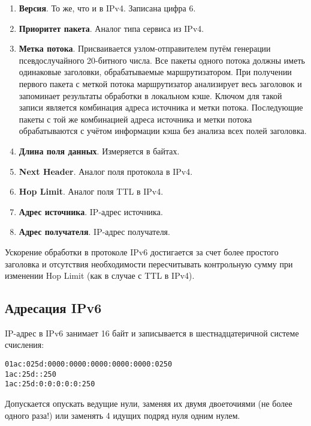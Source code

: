 \begin{enumerate}
    \item \textbf{Версия}. То же, что и в IPv4. Записана цифра 6.
    \item \textbf{Приоритет пакета}. Аналог типа сервиса из IPv4.
    \item \textbf{Метка потока}. Присваивается узлом-отправителем путём генерации псевдослучайного 20-битного числа. Все пакеты одного потока должны иметь одинаковые заголовки, обрабатываемые маршрутизатором. При получении первого пакета с меткой потока маршрутизатор анализирует весь заголовок и запоминает результаты обработки в локальном кэше. Ключом для такой записи является комбинация адреса источника и метки потока. Последующие пакеты с той же комбинацией адреса источника и метки потока обрабатываются с учётом информации кэша без анализа всех полей заголовка.
    \item \textbf{Длина поля данных}. Измеряется в байтах.
    \item \textbf{Next Header}. Аналог поля протокола в IPv4.
    \item \textbf{Hop Limit}. Аналог поля TTL в IPv4.
    \item \textbf{Адрес источника}. IP-адрес источника.
    \item \textbf{Адрес получателя}. IP-адрес получателя.
\end{enumerate}

Ускорение обработки в протоколе IPv6 достигается за счет более простого заголовка и отсутствия необходимости пересчитывать контрольную сумму при изменении Hop Limit (как в случае с TTL в IPv4).

\subsection{Адресация IPv6}

IP-адрес в IPv6 занимает 16 байт и записывается в шестнадцатеричной системе
счисления:
%
\begin{center}
    \texttt{01ac:025d:0000:0000:0000:0000:0000:0250}\\
    \texttt{\phantom{0}1ac:\phantom{0}25d:\phantom{0000:0000:0000:0000:0000}:\phantom{0}250}\\
    \texttt{\phantom{0}1ac:\phantom{0}25d:\phantom{000}0:\phantom{000}0:\phantom{000}0:\phantom{000}0:\phantom{000}0:\phantom{0}250}
\end{center}
%
Допускается опускать ведущие нули, заменяя их двумя двоеточиями (не более одного раза!) или заменять 4 идущих подряд нуля одним нулем.

